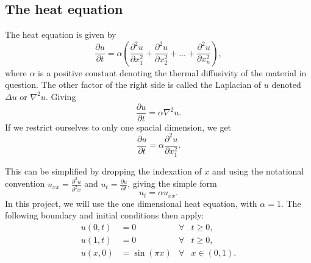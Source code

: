\documentclass{article}
\theoremstyle{definition}
\begin{document}
\subsection{The heat equation}
The heat equation is given by
\begin{equation*}
    \frac{\partial u}{ \partial t} = \alpha \left(\frac{\partial^2 u}{\partial x_1^2} + \frac{\partial^2 u}{\partial x_2^2} +... + \frac{\partial^2 u}{\partial x_n^2}\right),
\end{equation*}
where $\alpha$ is a positive constant denoting the thermal diffusivity of the material in question. The other factor of the right side is called the Laplacian of $u$ denoted $\Delta u$ or $\nabla^2 u$. Giving
\begin{equation*}
    \frac{\partial u}{\partial t} = \alpha \nabla^2 u.
\end{equation*}
If we restrict ourselves to only one spacial dimension, we get
\begin{equation*}
    \frac{\partial u}{ \partial t} = \alpha \frac{\partial^2 u}{\partial x_1^2}  .
\end{equation*}

This can be simplified by dropping the indexation of $x$ and using the notational convention $u_{xx} = \frac{\partial^2 u}{\partial^2 x} $ and $u_t = \frac{\partial u}{\partial t}$, giving the simple form
\begin{equation*}
    u_t = \alpha u_{xx}.
\end{equation*}
In this project, we will use the one dimensional heat equation, with $\alpha = 1$. The following boundary and initial conditions then apply:
\begin{align}
    u(0, t) &= 0            &\forall &t \geq 0, \nonumber \\
    u(1, t) &= 0            &\forall &t \geq 0, \label{eq:equation_conditions} \\
    u(x, 0) &= \sin(\pi x)  &\forall &x \in (0, 1). \nonumber
\end{align}


\end{document}
